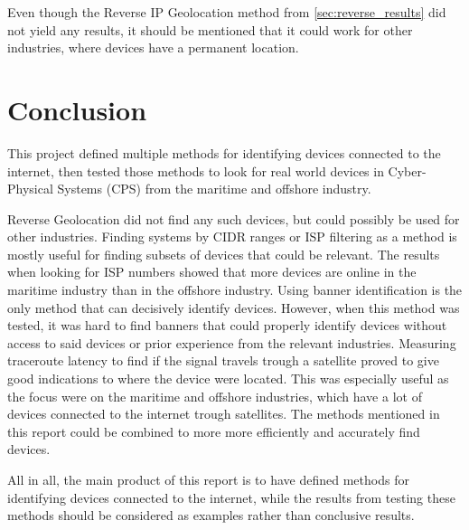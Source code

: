 Even though the Reverse IP Geolocation method from \cref{sec:reverse_results} did not yield any results, it should be mentioned that it could work for other industries, where devices have a permanent location.


\section{Conclusion} \label{sec:conclusion}
This project defined multiple methods for identifying devices connected to the internet, then tested those methods to look for real world devices in Cyber-Physical Systems (CPS) from the maritime and offshore industry.

Reverse Geolocation did not find any such devices, but could possibly be used for other industries. 
Finding systems by CIDR ranges or ISP filtering as a method is mostly useful for finding subsets of devices that could be relevant. The results when looking for ISP numbers showed that more devices are online in the maritime industry than in the offshore industry. 
Using banner identification is the only method that can decisively identify devices. However, when this method was tested, it was  hard to find banners that could properly identify devices without access to said devices or prior experience from the relevant industries.
Measuring traceroute latency to find if the signal travels trough a satellite proved to give good indications to where the device were located. This was especially useful as the focus were on the maritime and offshore industries, which have a lot of devices connected to the internet trough satellites. 
The methods mentioned in this report could be combined to more more efficiently and accurately find devices.

All in all, the main product of this report is to have defined methods for identifying devices connected to the internet, while the results from testing these methods should be considered as examples rather than conclusive results. 

